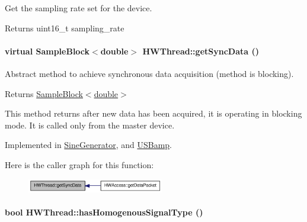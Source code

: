 Get the sampling rate set for the device. \begin{DoxyReturn}{Returns}
uint16\_\-t sampling\_\-rate 
\end{DoxyReturn}
\hypertarget{class_h_w_thread_add1215b3e0f06a856330f2debd7ea2fe}{
\paragraph[{getSyncData}]{\setlength{\rightskip}{0pt plus 5cm}virtual {\bf SampleBlock}$<$double$>$ HWThread::getSyncData ()}\hfill}
\label{class_h_w_thread_add1215b3e0f06a856330f2debd7ea2fe}


Abstract method to achieve synchronous data acquisition (method is blocking). \begin{DoxyReturn}{Returns}
\hyperlink{class_sample_block}{SampleBlock$<$double$>$}
\end{DoxyReturn}
This method returns after new data has been acquired, it is operating in blocking mode. It is called only from the master device. 

Implemented in \hyperlink{class_sine_generator_a7c239c664d3559988889cd5d9f90d854}{SineGenerator}, and \hyperlink{class_u_s_bamp_ae5aa6002d425924a95d102f1d890c84c}{USBamp}.

Here is the caller graph for this function:\nopagebreak
\begin{figure}[H]
\begin{center}
\leavevmode
\includegraphics[width=169pt]{class_h_w_thread_add1215b3e0f06a856330f2debd7ea2fe_icgraph}
\end{center}
\end{figure}
\hypertarget{class_h_w_thread_aaab242a33f6739fae59ce7a48d892072}{
\paragraph[{hasHomogenousSignalType}]{\setlength{\rightskip}{0pt plus 5cm}bool HWThread::hasHomogenousSignalType ()}\hfill}
\label{class_h_w_thread_aaab242a33f6739fae59ce7a48d892072}


